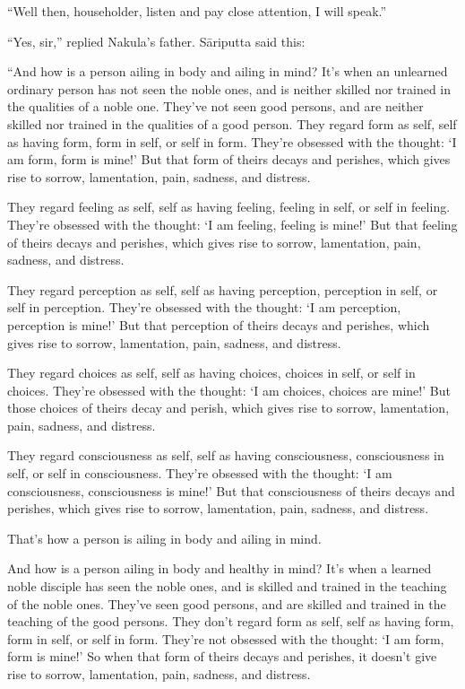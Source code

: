 \documentclass[12pt,openany]{book}%
\begin{document}
“Well then, householder, listen and pay close attention, I will speak.” 

“Yes, sir,” replied Nakula’s father. \textsanskrit{Sāriputta} said this: 

“And how is a person ailing in body and ailing in mind? It’s when an unlearned ordinary person has not seen the noble ones, and is neither skilled nor trained in the qualities of a noble one. They’ve not seen good persons, and are neither skilled nor trained in the qualities of a good person. They regard form as self, self as having form, form in self, or self in form. They’re obsessed with the thought: ‘I am form, form is mine!’ But that form of theirs decays and perishes, which gives rise to sorrow, lamentation, pain, sadness, and distress. 

They regard feeling as self, self as having feeling, feeling in self, or self in feeling. They’re obsessed with the thought: ‘I am feeling, feeling is mine!’ But that feeling of theirs decays and perishes, which gives rise to sorrow, lamentation, pain, sadness, and distress. 

They regard perception as self, self as having perception, perception in self, or self in perception. They’re obsessed with the thought: ‘I am perception, perception is mine!’ But that perception of theirs decays and perishes, which gives rise to sorrow, lamentation, pain, sadness, and distress. 

They regard choices as self, self as having choices, choices in self, or self in choices. They’re obsessed with the thought: ‘I am choices, choices are mine!’ But those choices of theirs decay and perish, which gives rise to sorrow, lamentation, pain, sadness, and distress. 

They regard consciousness as self, self as having consciousness, consciousness in self, or self in consciousness. They’re obsessed with the thought: ‘I am consciousness, consciousness is mine!’ But that consciousness of theirs decays and perishes, which gives rise to sorrow, lamentation, pain, sadness, and distress. 

That’s how a person is ailing in body and ailing in mind. 

And how is a person ailing in body and healthy in mind? It’s when a learned noble disciple has seen the noble ones, and is skilled and trained in the teaching of the noble ones. They’ve seen good persons, and are skilled and trained in the teaching of the good persons. They don’t regard form as self, self as having form, form in self, or self in form. They’re not obsessed with the thought: ‘I am form, form is mine!’ So when that form of theirs decays and perishes, it doesn’t give rise to sorrow, lamentation, pain, sadness, and distress. 
\end{document}
